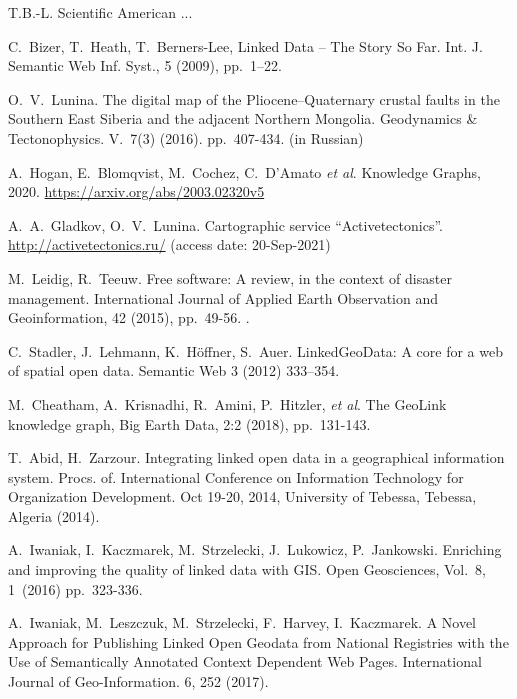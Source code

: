 \documentclass[
]{ceurart}
\begin{document}
\begin{thebibliography}{99}

 T.B.-L. Scientific American ...

 C.~Bizer, T.~Heath, T.~Berners-Lee, Linked Data -- The Story So Far. Int. J. Semantic Web Inf. Syst., 5 (2009), pp.~1--22. 

 O.~V.~Lunina.  The digital map of the Pliocene–Quaternary crustal faults in the Southern East Siberia and the adjacent Northern Mongolia. Geodynamics \& Tectonophysics. V.~7(3) (2016). pp.~407-434. (in Russian) 

 A.~Hogan, E.~Blomqvist, M.~Cochez, C.~D’Amato \emph{et al}. Knowledge Graphs, 2020. \url{https://arxiv.org/abs/2003.02320v5}

 A.~A.~Gladkov, O.~V.~Lunina. Cartographic service ``Activetectonics''. \url{http://activetectonics.ru/} (access date: 20-Sep-2021)

 M.~Leidig, R.~Teeuw. Free software: A review, in the context of disaster management. International Journal of Applied Earth Observation and Geoinformation, 42 (2015), pp.~49-56. .

 C.~Stadler, J.~Lehmann, K.~Höffner, S.~Auer. LinkedGeoData: A core for a web of spatial open data. Semantic Web 3 (2012) 333–354. 

 M.~Cheatham, A.~Krisnadhi, R.~Amini, P.~Hitzler, \emph{et al}. The GeoLink knowledge graph, Big Earth Data, 2:2 (2018), pp.~131-143. 

 T.~Abid, H.~Zarzour. Integrating linked open data in a geographical information system. Procs. of. International Conference on Information Technology for Organization Development. Oct 19-20, 2014, University of Tebessa, Tebessa, Algeria (2014).

 A.~Iwaniak, I.~Kaczmarek, M.~Strzelecki, J.~Lukowicz, P.~Jankowski. Enriching and improving the quality of linked data with GIS. Open Geosciences, Vol.~8, 1~(2016) pp.~323-336. 

 A.~Iwaniak, M.~Leszczuk, M.~Strzelecki, F.~Harvey, I.~Kaczmarek. A Novel Approach for Publishing Linked Open Geodata from National Registries with the Use of Semantically Annotated Context Dependent Web Pages. International Journal of Geo-Information. 6, 252 (2017). 


\end{thebibliography}
\end{document}
